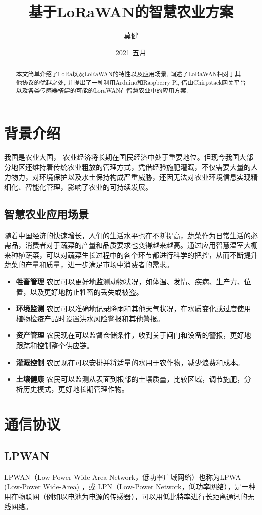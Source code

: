 \documentclass[scheme=chinese,a4paper]{article}
\title{基于LoRaWAN的智慧农业方案}
\author{莫健}
\date{2021 五月}
\begin{document}
\maketitle
\begin{abstract}
  本文简单介绍了LoRa以及LoRaWAN的特性以及应用场景, 阐述了LoRaWAN相对于其他协议的优越之处, 并提出了一种利用Arduino和Raspberry Pi, 借由Chirpstack网关平台以及各类传感器搭建的可能的LoraWAN在智慧农业中的应用方案. 
\end{abstract}
\tableofcontents
\newpage
\section{背景介绍}
我国是农业大国， 农业经济将长期在国民经济中处于重要地位。但现今我国大部分地区还维持着传统农业粗放的管理方式，凭借经验施肥灌溉，不仅需要大量的人力物力，对环境保护以及水土保持构成严重威胁，还因无法对农业环境信息实现精细化、智能化管理，影响了农业的可持续发展。

\subsection{智慧农业应用场景}
随着中国经济的快速增长，人们的生活水平也在不断提高，蔬菜作为日常生活的必需品，消费者对于蔬菜的产量和品质要求也变得越来越高。通过应用智慧温室大棚来种植蔬菜，可以对蔬菜生长过程中的各个环节都进行科学的把控，从而不断提升蔬菜的产量和质量，进一步满足市场中消费者的需求。\cite{lorawan_2}
\begin{itemize}
  \item\textbf{牲畜管理 }农民可以更好地监测动物状况，如体温、发情、疾病、生产力、位置，以及更好地防止牲畜的丢失或被盗。
  \item\textbf{环境监测 }农民可以准确地记录降雨和其他天气状况，在水质变化或过度使用植物检疫产品时设置洪水风险警报和其他警报。
  \item\textbf{资产管理 }农民现在可以监督仓储条件，收到关于闸门和设备的警报，更好地跟踪和控制整个供应链。
  \item\textbf{灌溉控制 }农民现在可以安排并将适量的水用于农作物，减少浪费和成本。
  \item\textbf{土壤健康 }农民可以监测从表面到根部的土壤质量，比较区域，调节施肥，分析历史模式，更好地长期管理作物。
\end{itemize}



\section{通信协议}
\subsection{LPWAN}
LPWAN（Low-Power Wide-Area Network，低功率广域网络）也称为LPWA (Low-Power Wide-Area) ，或 LPN（Low-Power Network，低功率网络），是一种用在物联网（例如以电池为电源的传感器），可以用低比特率进行长距离通讯的无线网络。
\end{document}
